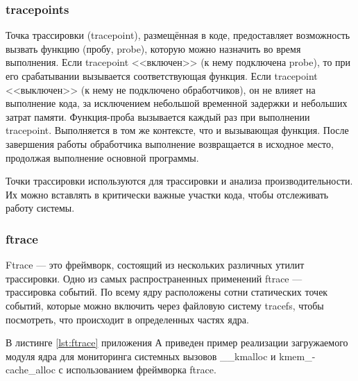 \subsubsection*{tracepoints}

Точка трассировки (tracepoint), размещённая в коде, предоставляет возможность вызвать функцию (пробу, probe), которую можно назначить во время выполнения.
Если tracepoint <<включен>> (к нему подключена probe), то при его срабатывании вызывается соответствующая функция.
Если tracepoint <<выключен>> (к нему не подключено обработчиков), он не влияет на выполнение кода, за исключением небольшой временной задержки и небольших затрат памяти.
Функция-проба вызывается каждый раз при выполнении tracepoint.
Выполняется в том же контексте, что и вызывающая функция.
После завершения работы обработчика выполнение возвращается в исходное место, продолжая выполнение основной программы.

Точки трассировки используются для трассировки и анализа производительности.
Их можно вставлять в критически важные участки кода, чтобы отслеживать работу системы.~\cite{tracepoints}


\subsubsection*{ftrace}

Ftrace --- это фреймворк, состоящий из нескольких различных утилит трассировки.
Одно из самых распространенных применений ftrace --- трассировка событий.
По всему ядру расположены сотни статических точек событий, которые можно включить через файловую систему tracefs, чтобы посмотреть, что происходит в определенных частях ядра.~\cite{ftrace}

В листинге \ref{lst:ftrace} приложения А приведен пример реализации загружаемого модуля ядра для мониторинга системных вызовов \_\_kmalloc и kmem\_-cache\_alloc с использованием фреймворка ftrace.


%
%

